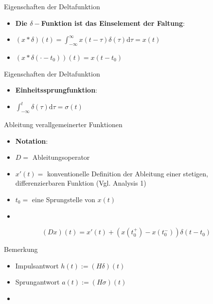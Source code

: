 \documentclass[14pt, aspectratio=169, handout]{beamer}
\begin{document}
\begin{frame}{Eigenschaften der Deltafunktion}
    \begin{itemize}
        \item[5.] \textbf{Die $\delta-$Funktion ist das Einselement der Faltung}:
        \item[] $(x \ast \delta)(t) = \displaystyle\int_{-\infty}^\infty x(t-\tau)\delta(\tau)\text{d}\tau = x(t)$
        \item[] $(x \ast \delta(\cdot - t_0))(t) = x(t - t_0)$
    \end{itemize}
\end{frame}

\begin{frame}{Eigenschaften der Deltafunktion}
    \begin{itemize}
        \item[6.] \textbf{Einheitssprungfunktion}:
        \item[] $\displaystyle\int_{-\infty}^t \delta(\tau) \text{d}\tau = \sigma(t)$
    \end{itemize}
\end{frame}

\begin{frame}{Ableitung verallgemeinerter Funktionen}
    \begin{itemize}
        \item \textbf{Notation}:
        \item[] $D =$ Ableitungsoperator
        \item[] $x'(t) =$ konventionelle Definition der Ableitung einer stetigen, differenzierbaren Funktion (Vgl. Analysis 1)
        \item[]  $t_0 =$ eine Sprungstelle von $x(t)$
        \item[] 
    \end{itemize}
    $$(Dx)(t) = x'(t) + (x(t_0^+)- x(t_0^-))\delta(t-t_0)$$
\end{frame}

\begin{frame}{Bemerkung}
    \begin{itemize}
        \item Impulsantwort $h(t) := (H \delta)(t)$
        \item Sprungantwort $a(t) := (H \sigma)(t)$
        \item[] 
    \end{itemize}
%
\end{frame}
\end{document}
